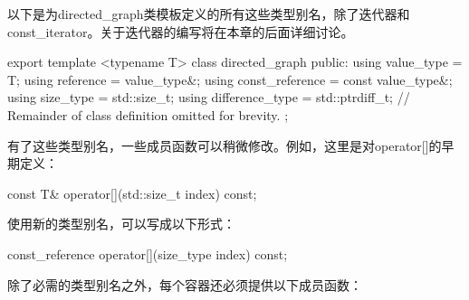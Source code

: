 以下是为directed\_graph类模板定义的所有这些类型别名，除了迭代器和const\_iterator。关于迭代器的编写将在本章的后面详细讨论。

\begin{cpp}
export template <typename T>
class directed_graph
{
    public:
        using value_type = T;
        using reference = value_type&;
        using const_reference = const value_type&;
        using size_type = std::size_t;
        using difference_type = std::ptrdiff_t;
        // Remainder of class definition omitted for brevity.
};
\end{cpp}

有了这些类型别名，一些成员函数可以稍微修改。例如，这里是对operator[]的早期定义：

\begin{cpp}
const T& operator[](std::size_t index) const;
\end{cpp}

使用新的类型别名，可以写成以下形式：

\begin{cpp}
const_reference operator[](size_type index) const;
\end{cpp}


除了必需的类型别名之外，每个容器还必须提供以下成员函数：

